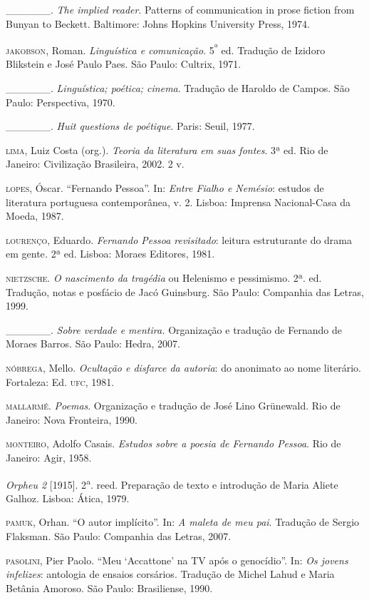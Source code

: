 \begin{hangparas}{.35in}{1}
\_\_\_\_\_\_. \emph{The implied reader}. Patterns of communication in
prose fiction from Bunyan to Beckett. Baltimore: Johns Hopkins
University Press, 1974.

\textsc{jakobson}, Roman. \emph{Linguística e comunicação}.
5\textsuperscript{ª} ed. Tradução de Izidoro Blikstein e José Paulo
Paes. São Paulo: Cultrix, 1971.

\textsc{\_\_\_\_\_\_.} \emph{Linguística; poética; cinema}. Tradução de
Haroldo de Campos. São Paulo: Perspectiva, 1970.

\_\_\_\_\_\_. \emph{Huit questions de poétique}. Paris: Seuil, 1977.

\textsc{lima}, Luiz Costa (org.). \emph{Teoria da literatura em suas
fontes}. 3ª ed. Rio de Janeiro: Civilização Brasileira, 2002. 2 v.

\textsc{lopes}, Óscar. ``Fernando Pessoa''. In: \emph{Entre Fialho e
Nemésio}: estudos de literatura portuguesa contemporânea, v. 2. Lisboa:
Imprensa Nacional-Casa da Moeda, 1987.

\textsc{lourenço}, Eduardo. \emph{Fernando Pessoa revisitado}: leitura
estruturante do drama em gente\emph{.} 2ª ed. Lisboa: Moraes Editores,
1981.

\textsc{nietzsche}. \emph{O nascimento da tragédia} ou Helenismo e
pessimismo. 2ª. ed. Tradução, notas e posfácio de Jacó Guinsburg. São
Paulo: Companhia das Letras, 1999.

\_\_\_\_\_\_. \emph{Sobre verdade e mentira.} Organização e tradução de
Fernando de Moraes Barros. São Paulo: Hedra, 2007.

\textsc{nóbrega}, Mello. \emph{Ocultação e disfarce da autoria}: do
anonimato ao nome literário. Fortaleza: Ed. \textsc{ufc}, 1981.

\textsc{mallarmé}. \emph{Poemas}. Organização e tradução de José Lino
Grünewald. Rio de Janeiro: Nova Fronteira, 1990.

\textsc{monteiro}, Adolfo Casais. \emph{Estudos sobre a poesia de
Fernando Pessoa}. Rio de Janeiro: Agir, 1958.

\emph{Orpheu 2} {[}1915{]}. 2\textsuperscript{a}. reed. Preparação de
texto e introdução de Maria Aliete Galhoz. Lisboa: Ática, 1979.

\textsc{pamuk}, Orhan. ``O autor implícito''. In: \emph{A maleta de meu
pai}. Tradução de Sergio Flaksman. São Paulo: Companhia das Letras,
2007.

\textsc{pasolini}, Pier Paolo. ``Meu `Accattone' na TV após o
genocídio''. In: \emph{Os jovens infelizes}: antologia de ensaios
corsários. Tradução de Michel Lahud e Maria Betânia Amoroso. São Paulo:
Brasiliense, 1990.


\end{hangparas}
